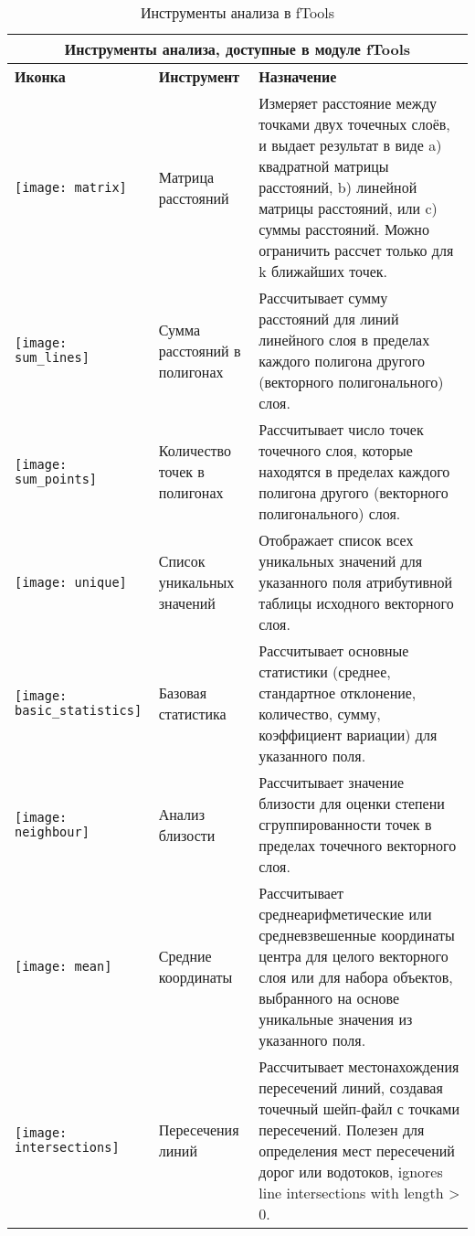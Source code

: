 \begin{table}[ht]
\centering
 \begin{tabular}{|m{1cm}|m{3cm}|m{9cm}|}
\hline \multicolumn{3}{|c|}{\textbf{Инструменты анализа, доступные в  модуле fTools}} \\
 \hline \textbf{Иконка} & \textbf{Инструмент} & \textbf{Назначение} \\
 \hline \texttt{[image: matrix]} & Матрица расстояний &
 Измеряет расстояние между точками двух точечных слоёв, и выдает результат в виде
 a) квадратной матрицы расстояний, b) линейной матрицы расстояний, или c) суммы расстояний.
 Можно ограничить рассчет только для k ближайших точек. \\
 \hline \texttt{[image: sum\_lines]} & Сумма расстояний в полигонах & Рассчитывает
 сумму расстояний для линий линейного слоя в пределах каждого полигона другого
 (векторного полигонального) слоя. \\
 \hline \texttt{[image: sum\_points]} & Количество точек в полигонах & Рассчитывает
 число точек точечного слоя, которые находятся в пределах каждого полигона другого
 (векторного полигонального) слоя. \\
 \hline \texttt{[image: unique]} & Список уникальных значений & Отображает
 список всех уникальных значений для указанного поля атрибутивной таблицы
 исходного векторного слоя. \\
 \hline \texttt{[image: basic\_statistics]} & Базовая статистика & Рассчитывает
 основные статистики (среднее, стандартное отклонение, количество,
 сумму, коэффициент вариации) для указанного поля. \\
 \hline \texttt{[image: neighbour]} & Анализ близости
 & Рассчитывает значение близости для оценки степени сгруппированности точек
 в пределах точечного векторного слоя. \\
 \hline \texttt{[image: mean]} & Средние координаты &
 Рассчитывает среднеарифметические или средневзвешенные координаты центра для целого векторного слоя
 или для набора объектов, выбранного на основе уникальные значения из указанного поля. \\
 \hline \texttt{[image: intersections]} & Пересечения линий &
 Рассчитывает местонахождения пересечений линий, создавая точечный шейп-файл с точками пересечений.
 Полезен для определения мест пересечений дорог или водотоков, ignores line intersections
 with length > 0. \\
 \hline
\end{tabular}
\caption{Инструменты анализа в fTools}\label{tab:ftool_analysis}
\end{table}

